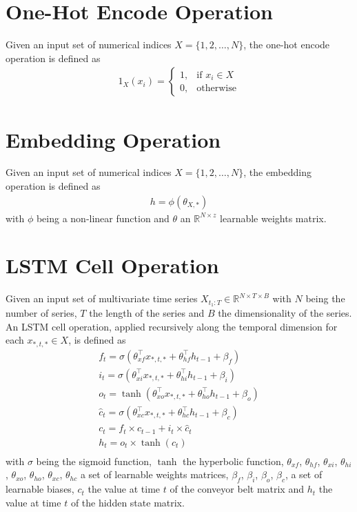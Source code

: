 \section{One-Hot Encode Operation}
Given an input set of numerical indices $X = \{1, 2, \dots, N\}$, the one-hot encode operation is defined as 
\begin{gather}
    \label{one_hot_encode_operation}
    1_X(x_i) = 
    \begin{cases}
        1,& \text{if } x_i \in X \\
        0,              & \text{otherwise}
    \end{cases}
\end{gather}

\section{Embedding Operation}
Given an input set of numerical indices $X = \{1, 2, \dots, N\}$, the embedding operation is defined as 
\begin{gather}
    \label{embedding_operation}
    h = \phi(\theta_{X,*})
\end{gather}
with $\phi$ being a non-linear function and $\theta$ an $\mathbb{R}^{N \times z}$ learnable weights matrix.

\section{LSTM Cell Operation}
Given an input set of multivariate time series $X_{t_1:T} \in \mathbb{R}^{N \times T \times B}$ with $N$ being the number of series, $T$ the length of the series and $B$ the dimensionality of the series. An LSTM cell operation, applied recursively along the temporal dimension for each $x_{*,t,*} \in X$, is defined as
\begin{gather}
    \label{lstm_operation}
    f_t = \sigma(\theta_{xf}^\top x_{*,t,*} + \theta_{hf}^\top h_{t-1} + \beta_f) \\ \nonumber
    i_t = \sigma(\theta_{xi}^\top x_{*,t,*} + \theta_{hi}^\top h_{t-1} + \beta_i) \\ \nonumber
    o_t = \tanh(\theta_{xo}^\top x_{*,t,*} + \theta_{ho}^\top h_{t-1} + \beta_o) \\ \nonumber
    \widehat{c}_t = \sigma(\theta_{xc}^\top x_{*,t,*} + \theta_{hc}^\top h_{t-1} + \beta_c) \\ \nonumber
    c_t = f_t \times c_{t-1} + i_t \times \widehat{c}_t \\ \nonumber
    h_t = o_t \times \tanh(c_t) \\ \nonumber
\end{gather}
with $\sigma$  being the sigmoid function, $\tanh$ the hyperbolic function, $\theta_{xf}$, $\theta_{hf}$, $\theta_{xi}$, $\theta_{hi}$, $\theta_{xo}$, $\theta_{ho}$, $\theta_{xc}$, $\theta_{hc}$ a set of learnable weights matrices, $\beta_f$, $\beta_i$, $\beta_o$, $\beta_c$, a set of learnable biases, $c_t$ the value at time $t$ of the conveyor belt matrix and $h_t$ the value at time $t$ of the hidden state matrix.


